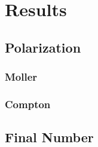 \chapter{Results}

\section{Polarization}
\subsection{Moller}
\subsection{Compton}

\section{Final Number}
